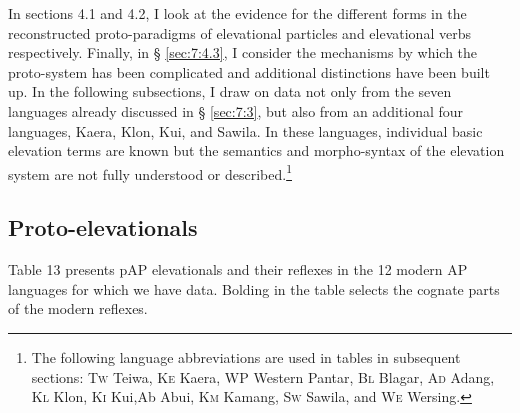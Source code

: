 In sections 4.1 and 4.2, I look at the evidence for the different forms in the reconstructed proto-paradigms of elevational particles and elevational verbs respectively. Finally, in {\S} \ref{sec:7:4.3}, I consider the mechanisms by which the proto-system has been complicated and additional distinctions have been built up. In the following subsections, I draw on data not only from the seven languages already discussed in {\S} \ref{sec:7:3}, but also from an additional four languages, Kaera, Klon, Kui, and Sawila. In these languages, individual basic elevation terms are known but the semantics and morpho-syntax of the elevation system are not fully understood or described.\footnote{{}  The following language abbreviations are used in tables in subsequent sections: \textsc{Tw} Teiwa, \textsc{Ke} Kaera, \textsc{WP} Western Pantar, \textsc{Bl} Blagar, \textsc{Ad} Adang, \textsc{Kl} Klon, \textsc{Ki} Kui,\textsc Ab  Abui, \textsc{Km} Kamang, \textsc{Sw} Sawila, and \textsc{We} Wersing.} 

\subsection{Proto-elevationals}\label{sec:7:4.1}
Table 13 presents pAP elevationals and their reflexes in the 12 modern AP languages for which we have data. Bolding in the table selects the cognate parts of the modern reflexes.

 


